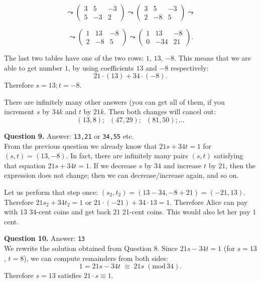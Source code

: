 \documentclass[jou]{apa6}
\begin{document}
$$
\leadsto
\left( \begin{array}{ccc}
3 & 5 & -3 \\
5 & -3 & 2 \end{array} \right) 
\leadsto
\left( \begin{array}{ccc}
3 & 5 & -3 \\
2 & -8 & 5 \end{array} \right) 
\leadsto
$$

$$\leadsto
\left( \begin{array}{ccc}
1 & 13 & -8 \\
2 & -8 & 5 \end{array} \right) 
\leadsto
\left( \begin{array}{ccc}
1 & 13 & -8 \\
0 & -34 & 21 \end{array} \right).$$

The last two tables have one of the two rows:
$1$, $13$, $-8$. This means that we are able
to get number $1$, by using coefficients $13$ 
and $-8$ respectively: 
$$21 \cdot (13) + 34 \cdot (-8).$$
Therefore $s = 13; t = -8$. 

There are infinitely many other answers (you can get 
all of them, if you increment $s$ by $34k$ and 
$t$ by $21k$. Then both changes will cancel out: 
$$(13,8);\;\;(47,29);\;\;(81,50);\ldots$$


\vspace{6pt}
{\bf Question 9.} Answer: {\tt 13,21} or {\tt 34,55} etc.\\
From the previous question we already know that $21s + 34t = 1$
for $(s,t) = (13,-8)$. In fact, there are infinitely 
many pairs $(s,t)$ satisfying that equation $21s + 34t = 1$. 
If we decrease $s$ by $34$ and increase 
$t$ by $21$, then the expression does not change; then 
we can decrease/increase again, and so on.

Let us perform that step once: $(s_2,t_2) = (13-34,-8+21) = (-21,13)$.
Therefore $21s_2 + 34t_2 = 1$ or $21\cdot (-21) + 34 \cdot 13 = 1$. 
Therefore Alice can pay with $13$ 34-cent coins and get back 
$21$ 21-cent coins. This would also let her pay $1$ cent.

\vspace{6pt}
{\bf Question 10.} Answer: {\tt 13}\\
We rewrite the solution obtained from Question 8.
Since $21s - 34t = 1$ (for $s=13$, $t=8$), 
we can compute remainders
from both sides:
$$1 = 21s - 34t \;\equiv\; 21s\;(\text{mod}\,34).$$
Therefore $s=13$ satisfies $21 \cdot s \equiv 1$.  
\end{document}
